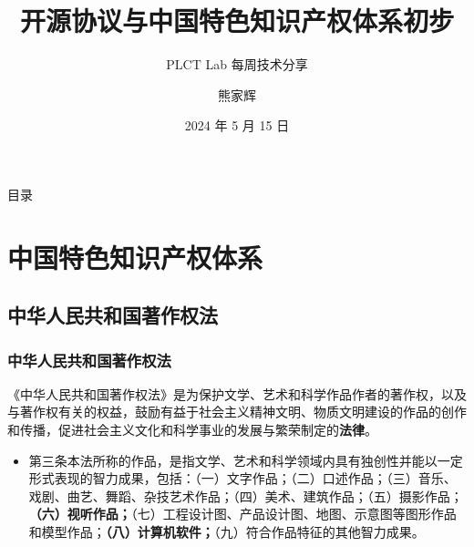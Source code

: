 \documentclass[xcolor=table,dvipsnames,svgnames,aspectratio=169]{ctexbeamer}
\author{熊家辉}
\institute[萨塞克斯人工智能学院]{浙江工商大学}
\date{2024 年 5 月 15 日}
\title[开源协议在中国] %
{\textbf{开源协议与中国特色知识产权体系初步}} %
\subtitle{PLCT Lab 每周技术分享}
\begin{document}
\AtBeginSection[]{
  \begin{frame}
    \sectionpage
  \end{frame}
}

\AtBeginSubsection[]{		       %
  \begin{frame}
    \subsectionpage
  \end{frame}
}

\maketitle

\begin{frame}{目录}
  \tableofcontents[hideallsubsections]	%
\end{frame}

\section{中国特色知识产权体系}

\subsection{中华人民共和国著作权法}

\begin{frame}
  \frametitle{中华人民共和国著作权法}

  《中华人民共和国著作权法》是为保护文学、艺术和科学作品作者的著作权，以及与著作权有关的权益，鼓励有益于社会主义精神文明、物质文明建设的作品的创作和传播，促进社会主义文化和科学事业的发展与繁荣制定的\textbf{法律}。

  \begin{itemize}
    \item 第三条本法所称的作品，是指文学、艺术和科学领域内具有独创性并能以一定形式表现的智力成果，包括：（一）文字作品；（二）口述作品；（三）音乐、戏剧、曲艺、舞蹈、杂技艺术作品；（四）美术、建筑作品；（五）摄影作品；\textbf{（六）视听作品；}（七）工程设计图、产品设计图、地图、示意图等图形作品和模型作品；\textbf{（八）计算机软件；}（九）符合作品特征的其他智力成果。
  \end{itemize}
\end{frame}
\end{document}
